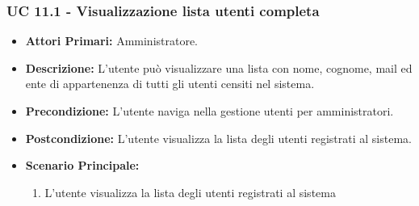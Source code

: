 			\subsubsection{UC 11.1 - Visualizzazione lista utenti completa}
			\begin{itemize}
				\item \textbf{Attori Primari:} Amministratore.
				\item \textbf{Descrizione:} L'utente può visualizzare una lista con nome, cognome, mail ed ente di appartenenza di tutti gli utenti censiti nel sistema.
				\item \textbf{Precondizione:} L'utente naviga nella gestione utenti per amministratori.
				\item \textbf{Postcondizione:} L'utente visualizza la lista degli utenti registrati al sistema.
				\item \textbf{Scenario Principale:}
				\begin{enumerate}
					\item{L'utente visualizza la lista degli utenti registrati al sistema}
				\end{enumerate}	
			\end{itemize}
			
